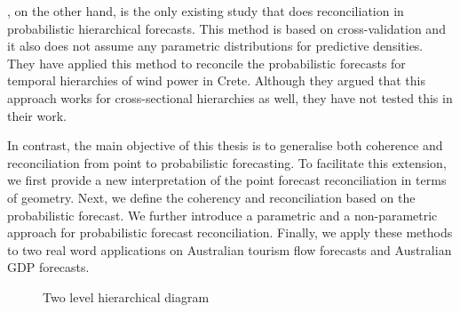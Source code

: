 	\citet{Jeon2018}, on the other hand, is the only existing study that does reconciliation in probabilistic hierarchical forecasts. This method is based on cross-validation and it also does not assume any parametric distributions for predictive densities. They have applied this method to reconcile the probabilistic forecasts for temporal hierarchies of wind power in Crete. Although they argued that this approach works for cross-sectional hierarchies as well, they have not tested this in their work.   
	
	In contrast, the main objective of this thesis is to generalise both coherence and reconciliation from point to probabilistic forecasting. To facilitate this extension, we first provide a new interpretation of the point forecast reconciliation in terms of geometry. Next, we define the coherency and reconciliation based on the probabilistic forecast. We further introduce a parametric and a non-parametric approach for probabilistic forecast reconciliation. Finally, we apply these methods to two real word applications on Australian tourism flow forecasts and Australian GDP forecasts.   
	




\begin{figure}[H]
	\begin{center}
		  
		 
		\qobitree
	\end{center}
	\caption{Two level hierarchical diagram}\label{fig:7-D_Hierarchy}
\end{figure}
















